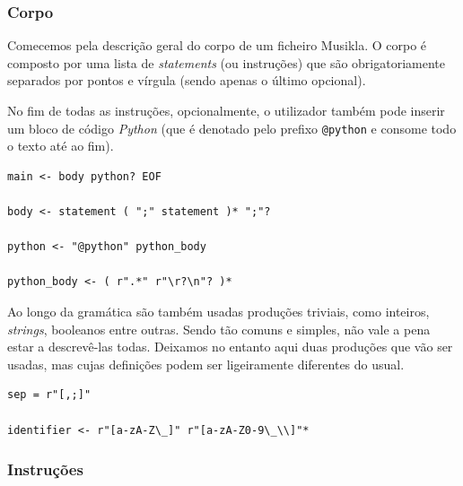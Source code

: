 \subsubsection{Corpo}
Comecemos pela descrição geral do corpo de um ficheiro Musikla. O corpo é composto por uma lista de \textit{statements} (ou instruções) que são obrigatoriamente separados por pontos e vírgula (sendo apenas o último opcional). 

No fim de todas as instruções, opcionalmente, o utilizador também pode inserir um bloco de código \textit{Python} (que é denotado pelo prefixo \texttt{@python} e consome todo o texto até ao fim).

\begin{lstlisting}[caption={Produções base da gramática},language={}]
main <- body python? EOF

body <- statement ( ";" statement )* ";"?

python <- "@python" python_body

python_body <- ( r".*" r"\r?\n"? )*
\end{lstlisting}

Ao longo da gramática são também usadas produções triviais, como inteiros, \textit{strings}, booleanos entre outras. Sendo tão comuns e simples, não vale a pena estar a descrevê-las todas. Deixamos no entanto aqui duas produções que vão ser usadas, mas cujas definições podem ser ligeiramente diferentes do usual.

\begin{lstlisting}[caption={Produções base da gramática},language={}]
sep = r"[,;]"

identifier <- r"[a-zA-Z\_]" r"[a-zA-Z0-9\_\\]"*
\end{lstlisting}

\subsubsection{Instruções}

